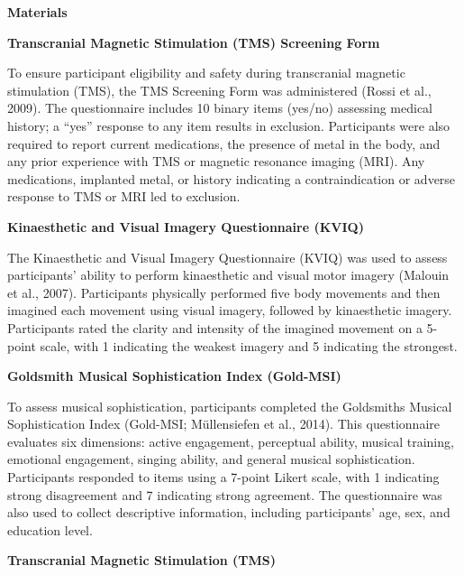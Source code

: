\documentclass[
]{article}
\begin{document}
\textbf{Materials}

\textbf{Transcranial Magnetic Stimulation (TMS) Screening Form}

To ensure participant eligibility and safety during transcranial
magnetic stimulation (TMS), the TMS Screening Form was administered
(Rossi et al., 2009). The questionnaire includes 10 binary items
(yes/no) assessing medical history; a ``yes'' response to any item
results in exclusion. Participants were also required to report current
medications, the presence of metal in the body, and any prior experience
with TMS or magnetic resonance imaging (MRI). Any medications, implanted
metal, or history indicating a contraindication or adverse response to
TMS or MRI led to exclusion.

\textbf{Kinaesthetic and Visual Imagery Questionnaire (KVIQ)}

The Kinaesthetic and Visual Imagery Questionnaire (KVIQ) was used to
assess participants' ability to perform kinaesthetic and visual motor
imagery (Malouin et al., 2007). Participants physically performed five
body movements and then imagined each movement using visual imagery,
followed by kinaesthetic imagery. Participants rated the clarity and
intensity of the imagined movement on a 5-point scale, with 1 indicating
the weakest imagery and 5 indicating the strongest.

\textbf{Goldsmith Musical Sophistication Index (Gold-MSI)}

To assess musical sophistication, participants completed the Goldsmiths
Musical Sophistication Index (Gold-MSI; Müllensiefen et al., 2014). This
questionnaire evaluates six dimensions: active engagement, perceptual
ability, musical training, emotional engagement, singing ability, and
general musical sophistication. Participants responded to items using a
7-point Likert scale, with 1 indicating strong disagreement and 7
indicating strong agreement. The questionnaire was also used to collect
descriptive information, including participants' age, sex, and education
level.

\textbf{Transcranial Magnetic Stimulation (TMS)}
\end{document}
